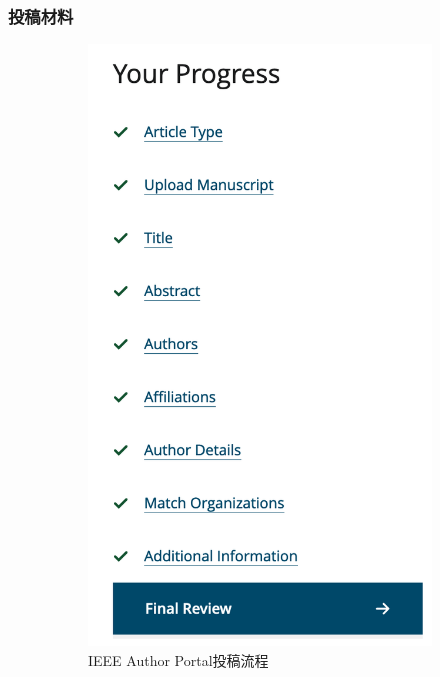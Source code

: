 \documentclass{beamer}
\begin{document}
\begin{frame}
    \frametitle{投稿材料}
    \begin{figure}
      \centering
      \begin{subfigure}[b]{0.2\textwidth}
        \centering
        \includegraphics[width=\textwidth]{./fig/submit.png}
        \caption{IEEE Author Portal投稿流程}
        \label{fig:authorportal}
      \end{subfigure}
      \hfill
      \begin{subfigure}[b]{0.45\textwidth}

\end{subfigure}
\end{figure}
\end{frame}
\end{document}
